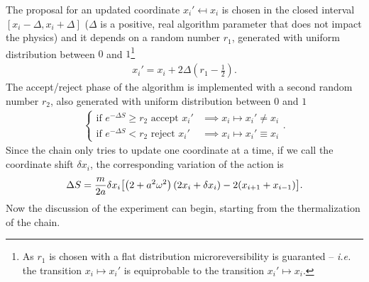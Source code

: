 The proposal for an updated coordinate  $x_{i}' \mapsfrom x_{i}$ is chosen in the closed interval $[x_{i} - \Delta, x_{i} +\Delta]$ ($\Delta$ is
a positive, real algorithm parameter that does not impact the physics)
and it depends on a random number $r_{1}$, generated with uniform distribution
between $0$ and $1$\footnote{As $r_{1}$ is chosen with a flat distribution microreversibility is guaranted -- \textit{i.e.} the transition $x_{i}\mapsto x_{i}' $ is equiprobable to the transition $x_{i}'\mapsto x_{i}$.}
\begin{align}
  \label{eqn:proposal}
  x_{i}' = x_{i}+ 2\Delta \left(r_{1} - \frac{1}{2}\right).
\end{align}
The accept/reject phase of the algorithm is implemented with a second random number $r_{2}$, also generated with uniform distribution
between $0$ and $1$
\begin{align}
  \begin{cases}
    \text{if } e ^{-\Delta S} \ge r_{2} \text{ accept } x_{i}'  &\implies x_{i} \mapsto x_{i}' \neq x_{i} \\
    \text{if }e ^{-\Delta S} < r_{2} \text{ reject } x_{i}' &\implies x_{i} \mapsto x_{i}' \equiv x_{i}
  \end{cases}.
\end{align}
Since the chain only tries to update one coordinate at a time, if we call the coordinate shift $\delta x_{i}$, the
corresponding variation of the action is
\begin{align}
  \Delta S = \frac{m}{2a}\delta x_{i}\qty[\left(2+a ^2\omega ^2\right)\left(2x_{i}+\delta x_{i}\right) - 2(x_{i+1}+x_{{i-1}})].
\end{align}
Now the discussion of the experiment can begin, starting from the thermalization of the chain.
